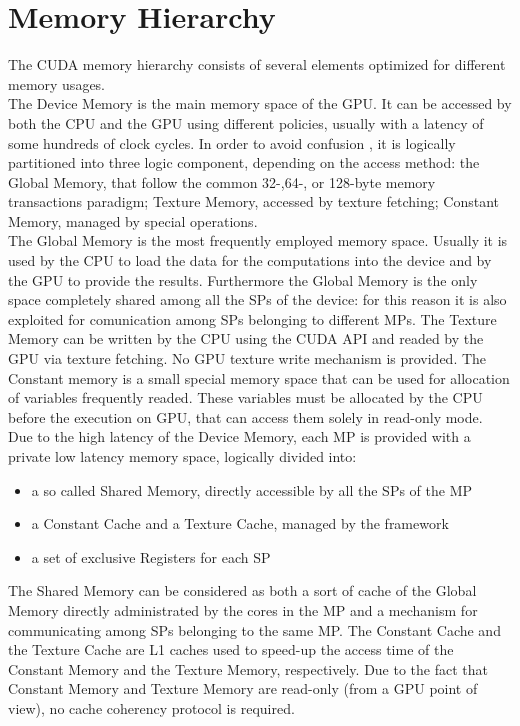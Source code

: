 \section{Memory Hierarchy}
The CUDA memory hierarchy consists of several elements optimized for different memory usages.\\
The Device Memory is the main memory space of the GPU. It can be accessed by both the CPU and the GPU using different policies, usually with a latency of some hundreds of clock cycles. In order to avoid confusion %
, it is logically partitioned into three logic component, depending on the access method: the Global Memory, that follow the common 32-,64-, or 128-byte memory transactions paradigm; Texture Memory, accessed by texture fetching; Constant Memory, managed by special operations.\\
The Global Memory is the most frequently employed memory space. Usually it is used by the CPU to load the data for the computations into the device and by the GPU to provide the results. Furthermore the Global Memory is the only space completely shared among all the SPs of the device: for this reason it is also exploited for comunication among SPs belonging to different MPs. The Texture Memory can be written by the CPU using the CUDA API and readed by the GPU via texture fetching. No GPU texture write mechanism is provided. The Constant memory is a small special memory space that can be used for allocation of variables frequently readed. These variables must be allocated by the CPU before the execution on GPU, that can access them solely in read-only mode.\\ 
Due to the high latency of the Device Memory, each MP is provided with a private low latency memory space, logically divided into:
\begin{itemize}
\item a so called Shared Memory, directly accessible by all the SPs of the MP
\item a Constant Cache and a Texture Cache, managed by the framework
\item a set of exclusive Registers for each SP
\end{itemize}
The Shared Memory can be considered as both a sort of cache of the Global Memory %
 directly administrated by the cores in the MP and a mechanism for communicating among SPs belonging to the same MP. The Constant Cache and the Texture Cache are L1 caches used to speed-up the access time of the Constant Memory and the Texture Memory, respectively. Due to the fact that Constant Memory and Texture Memory are read-only (from a GPU point of view), no cache coherency protocol is required.\\ 

